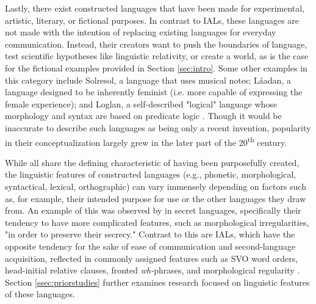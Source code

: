 \documentclass[12pt,a4paper]{article}
\numberwithin{figure}{section}
\numberwithin{table}{section}
\numberwithin{definition}{section}
\begin{document}



Lastly, there exist constructed languages that have been made for experimental, artistic, literary, or fictional purposes. In contrast to IALs, these languages are not made with the intention of replacing existing languages for everyday communication. Instead, their creators want to push the boundaries of language, test scientific hypotheses like linguistic relativity, or create a world, as is the case for the fictional examples provided in Section \ref{sec:intro}. Some other examples in this category include Solresol, a language that uses musical notes; Láadan, a language designed to be inherently feminist (i.e. more capable of expressing the female experience); and Loglan, a self-described "logical" language whose morphology and syntax are based on predicate logic \parencite{Adelman2014article}. Though it would be inaccurate to describe such languages as being only a recent invention, popularity in their conceptualization largely grew in the later part of the 20\textsuperscript{th} century.

While all share the defining characteristic of having been purposefully created, the linguistic features of constructed languages (e.g., phonetic, morphological, syntactical, lexical, orthographic) can vary immensely depending on factors such as, for example, their intended purpose for use or the other languages they draw from. An example of this was observed by \textcite{Gobbo2016article} in secret languages, specifically their tendency to have more complicated features, such as morphological irregularities, "in order to preserve their secrecy." Contrast to this are IALs, which have the opposite tendency for the sake of ease of communication and second-language acquisition, reflected in commonly assigned features such as SVO word orders, head-initial relative clauses, fronted \textit{wh-}phrases, and morphological regularity \parencite{goodall2022article,Gobbo2016article}. Section \ref{ssec:priorstudies} further examines research focused on linguistic features of these languages. 
\end{document}
